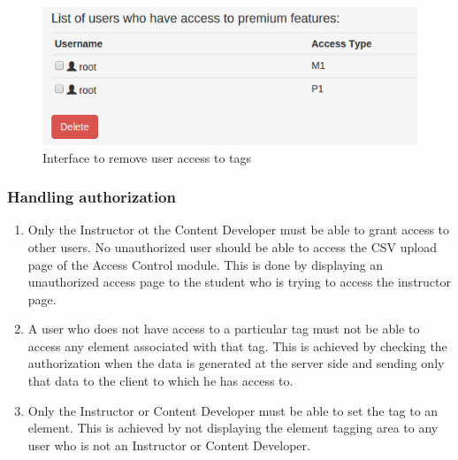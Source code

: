 \begin{figure}[h]
\centering
\includegraphics[width=0.8\linewidth]{./media/removeusers}
\caption{Interface to remove user access to tags}
\label{fig:removeusers}
\end{figure}

\subsubsection{Handling authorization}

\begin{enumerate}
	\item Only the Instructor ot the Content Developer must be able to grant access to other users. No unauthorized user should be able to access the CSV upload page of the Access Control module. This is done by displaying an unauthorized access page to the student who is trying to access the instructor page.
	\item A user who does not have access to a particular tag must not be able to access any element associated with that tag. This is achieved by checking the authorization when the data is generated at the server side and sending only that data to the client to which he has access to.
	\item Only the Instructor or Content Developer must be able to set the tag to an element. This is achieved by not displaying the element tagging area to any user who is not an Instructor or Content Developer.
\end{enumerate}

